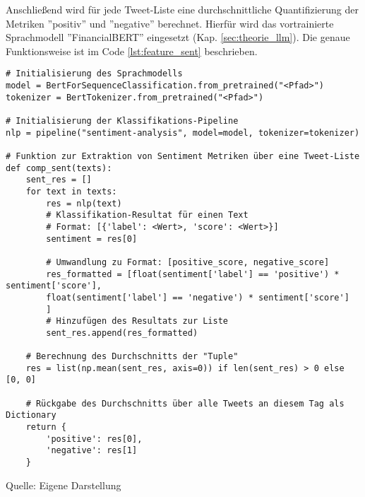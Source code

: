 Anschließend wird für jede Tweet-Liste eine durchschnittliche Quantifizierung der Metriken ''positiv'' und ''negative'' berechnet. Hierfür wird das vortrainierte Sprachmodell ''FinancialBERT'' eingesetzt (Kap. \ref{sec:theorie_llm}). Die genaue Funktionsweise ist im Code \ref{lst:feature_sent} beschrieben.
\begin{lstlisting}[caption={Stimmung quantifiziert als Positiv/Negativ-Score}, label=lst:feature_sent, captionpos=t]
# Initialisierung des Sprachmodells
model = BertForSequenceClassification.from_pretrained("<Pfad>")
tokenizer = BertTokenizer.from_pretrained("<Pfad>")

# Initialisierung der Klassifikations-Pipeline
nlp = pipeline("sentiment-analysis", model=model, tokenizer=tokenizer)

# Funktion zur Extraktion von Sentiment Metriken über eine Tweet-Liste
def comp_sent(texts):
	sent_res = []
	for text in texts:
		res = nlp(text)
		# Klassifikation-Resultat für einen Text
		# Format: [{'label': <Wert>, 'score': <Wert>}]
		sentiment = res[0]
		
		# Umwandlung zu Format: [positive_score, negative_score]
		res_formatted = [float(sentiment['label'] == 'positive') * sentiment['score'], 
		float(sentiment['label'] == 'negative') * sentiment['score']
		]
		# Hinzufügen des Resultats zur Liste
		sent_res.append(res_formatted)

	# Berechnung des Durchschnitts der "Tuple"
	res = list(np.mean(sent_res, axis=0)) if len(sent_res) > 0 else [0, 0]

	# Rückgabe des Durchschnitts über alle Tweets an diesem Tag als Dictionary
	return {
		'positive': res[0],
		'negative': res[1]
	}
\end{lstlisting}
\vspace{-1.3em}
\normalsize{Quelle: Eigene Darstellung}


